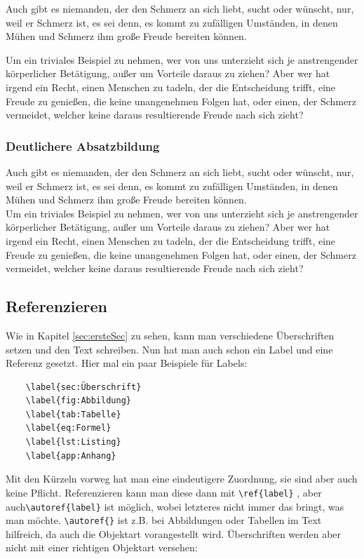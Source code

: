 Auch gibt es niemanden, der den Schmerz an sich liebt, sucht oder wünscht, nur, weil er Schmerz ist, es sei denn, es kommt zu zufälligen Umständen, in denen Mühen und Schmerz ihm große Freude bereiten können. %

Um ein triviales Beispiel zu nehmen, wer von uns unterzieht sich je anstrengender körperlicher Betätigung, außer um Vorteile daraus zu ziehen? Aber wer hat irgend ein Recht, einen Menschen zu tadeln, der die Entscheidung trifft, eine Freude zu genießen, die keine unangenehmen Folgen hat, oder einen, der Schmerz vermeidet, welcher keine daraus resultierende Freude nach sich zieht?


\subsubsection{Deutlichere Absatzbildung} \label{sec:deutlicher-absatz}

Auch gibt es niemanden, der den Schmerz an sich liebt, sucht oder wünscht, nur, weil er Schmerz ist, es sei denn, es kommt zu zufälligen Umständen, in denen Mühen und Schmerz ihm große Freude bereiten können.\\ %

Um ein triviales Beispiel zu nehmen, wer von uns unterzieht sich je anstrengender körperlicher Betätigung, außer um Vorteile daraus zu ziehen? Aber wer hat irgend ein Recht, einen Menschen zu tadeln, der die Entscheidung trifft, eine Freude zu genießen, die keine unangenehmen Folgen hat, oder einen, der Schmerz vermeidet, welcher keine daraus resultierende Freude nach sich zieht?


\subsection{Referenzieren}

Wie in Kapitel \ref{sec:ersteSec} zu sehen, kann man verschiedene Überschriften setzen und den Text schreiben. Nun hat man auch schon ein Label und eine Referenz gesetzt. Hier mal ein paar Beispiele für Labels:

\begin{verbatim}
    \label{sec:Überschrift}
    \label{fig:Abbildung}
    \label{tab:Tabelle}
    \label{eq:Formel}
    \label{lst:Listing}
    \label{app:Anhang}
\end{verbatim}

Mit den Kürzeln vorweg hat man eine eindeutigere Zuordnung, sie sind aber auch keine Pflicht. Referenzieren kann man diese dann mit \verb|\ref{label}| , aber auch\linebreak \verb|\autoref{label}| ist möglich, wobei letzteres nicht immer das bringt, was man möchte. \verb|\autoref{}| ist z.B. bei Abbildungen oder Tabellen im Text hilfreich, da auch die Objektart vorangestellt wird. Überschriften werden aber nicht mit einer richtigen Objektart versehen:

